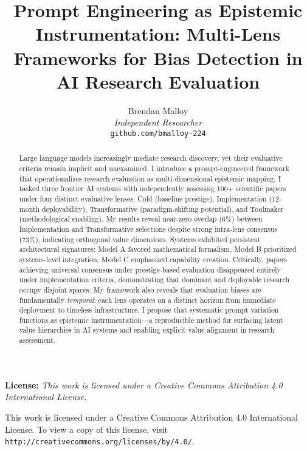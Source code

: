 \documentclass{article}
\begin{document}
\title{Prompt Engineering as Epistemic Instrumentation: Multi-Lens Frameworks for Bias Detection in AI Research Evaluation}

\author{Brendan Malloy\\
\textit{Independent Researcher}\\
\texttt{github.com/bmalloy-224}}

\maketitle

\begin{abstract}
Large language models increasingly mediate research discovery, yet their evaluative criteria remain implicit and unexamined. I introduce a prompt-engineered framework that operationalizes research evaluation as multi-dimensional epistemic mapping. I tasked three frontier AI systems with independently assessing 100+ scientific papers under four distinct evaluative lenses: Cold (baseline prestige), Implementation (12-month deployability), Transformative (paradigm-shifting potential), and Toolmaker (methodological enabling). My results reveal near-zero overlap (6\%) between Implementation and Transformative selections despite strong intra-lens consensus (73\%), indicating orthogonal value dimensions. Systems exhibited persistent architectural signatures: Model A favored mathematical formalism, Model B prioritized systems-level integration, Model C emphasized capability creation. Critically, papers achieving universal consensus under prestige-based evaluation disappeared entirely under implementation criteria, demonstrating that dominant and deployable research occupy disjoint spaces. My framework also reveals that evaluation biases are fundamentally \textit{temporal}: each lens operates on a distinct horizon from immediate deployment to timeless infrastructure. I propose that systematic prompt variation functions as epistemic instrumentation—a reproducible method for surfacing latent value hierarchies in AI systems and enabling explicit value alignment in research assessment.
\end{abstract}

\textbf{License:} \textit{This work is licensed under a Creative Commons Attribution 4.0 International License.}

\begin{center}
\small
This work is licensed under a Creative Commons Attribution 4.0 International License. 
To view a copy of this license, visit \texttt{http://creativecommons.org/licenses/by/4.0/}.
\end{center}
\end{document}
